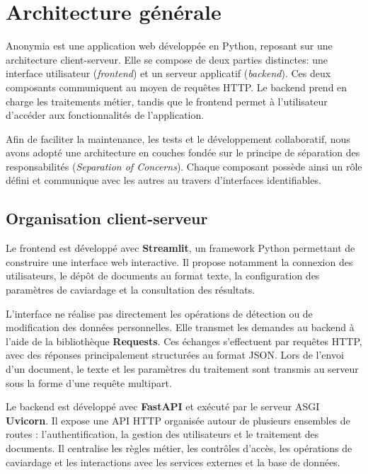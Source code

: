 \documentclass[12pt,a4paper]{article}
\begin{document}

\section{Architecture générale}

Anonymia est une application web développée en Python, reposant sur une architecture client-serveur. Elle se compose de deux parties distinctes: une interface utilisateur (\textit{frontend}) et un serveur applicatif (\textit{backend}). Ces deux composants communiquent au moyen de requêtes HTTP. Le backend prend en charge les traitements métier, tandis que le frontend permet à l'utilisateur d'accéder aux fonctionnalités de l'application.

Afin de faciliter la maintenance, les tests et le développement collaboratif, nous avons adopté une architecture en couches fondée sur le principe de séparation des responsabilités (\textit{Separation of Concerns}). Chaque composant possède ainsi un rôle défini et communique avec les autres au travers d'interfaces identifiables.



\subsection{Organisation client-serveur}

Le frontend est développé avec \textbf{Streamlit}, un framework Python permettant de construire une interface web interactive. Il propose notamment la connexion des utilisateurs, le dépôt de documents au format texte, la configuration des paramètres de caviardage et la consultation des résultats.

L'interface ne réalise pas directement les opérations de détection ou de modification des données personnelles. Elle transmet les demandes au backend à l'aide de la bibliothèque \textbf{Requests}. Ces échanges s'effectuent par requêtes HTTP, avec des réponses principalement structurées au format JSON. Lors de l'envoi d'un document, le texte et les paramètres du traitement sont transmis au serveur sous la forme d'une requête multipart.

Le backend est développé avec \textbf{FastAPI} et exécuté par le serveur ASGI \textbf{Uvicorn}. Il expose une API HTTP organisée autour de plusieurs ensembles de routes : l'authentification, la gestion des utilisateurs et le traitement des documents. Il centralise les règles métier, les contrôles d'accès, les opérations de caviardage et les interactions avec les services externes et la base de données.
\end{document}
